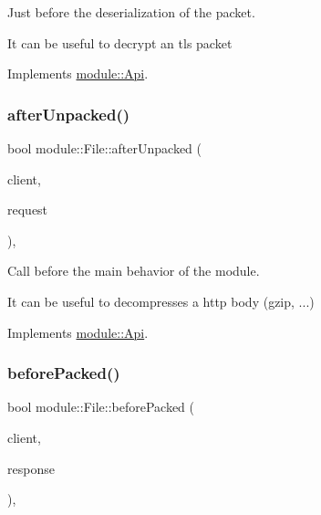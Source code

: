 Just before the deserialization of the packet. 

It can be useful to decrypt an tls packet 

Implements \hyperlink{structmodule_1_1Api_ad8b56820e4f53bf65d34447184edef20}{module\+::\+Api}.

\mbox{\label{classmodule_1_1File_a201c3c9c01df460e22f270c554937639}} 
\subsubsection{\texorpdfstring{after\+Unpacked()}{afterUnpacked()}}
{\footnotesize\ttfamily bool module\+::\+File\+::after\+Unpacked (\begin{DoxyParamCaption}\item[{const \hyperlink{structnet_1_1IClient}{net\+::\+I\+Client} \&}]{client,  }\item[{\hyperlink{structhttp_1_1IRequest}{http\+::\+I\+Request} \&}]{request }\end{DoxyParamCaption})\hspace{0.3cm}{\ttfamily [virtual]}, {\ttfamily [noexcept]}}



Call before the main behavior of the module. 

It can be useful to decompresses a http body (gzip, ...) 

Implements \hyperlink{structmodule_1_1Api_a291297e6d233e69b82c976e085f7c237}{module\+::\+Api}.

\mbox{\label{classmodule_1_1File_ab2004b38d5dd63e0e19f358a3820477f}} 
\subsubsection{\texorpdfstring{before\+Packed()}{beforePacked()}}
{\footnotesize\ttfamily bool module\+::\+File\+::before\+Packed (\begin{DoxyParamCaption}\item[{const \hyperlink{structnet_1_1IClient}{net\+::\+I\+Client} \&}]{client,  }\item[{\hyperlink{structhttp_1_1IResponse}{http\+::\+I\+Response} \&}]{response }\end{DoxyParamCaption})\hspace{0.3cm}{\ttfamily [virtual]}, {\ttfamily [noexcept]}}



